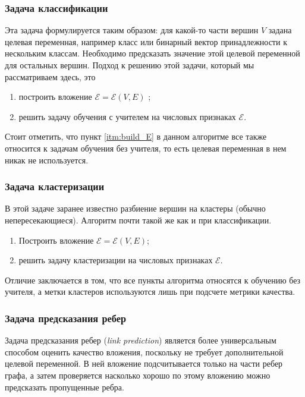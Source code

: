 \documentclass[12pt,a4paper]{extarticle}
\newcommand{\E}{\mathcal{E}}
\begin{document}
    \subsubsection{Задача классификации}
    
    Эта задача формулируется таким образом: для какой-то части вершин $V$ задана целевая переменная, например класс или бинарный вектор принадлежности к нескольким классам. Необходимо предсказать значение этой целевой переменной для остальных вершин.
    Подход к решению этой задачи, который мы рассматриваем здесь, это 
    \begin{enumerate}
        \item построить вложение $\E = \E(V, E)$ \label{itm:build_E};
        \item решить задачу обучения с учителем на числовых признаках $\E$.
    \end{enumerate}
    
    Стоит отметить, что пункт \ref{itm:build_E} в данном алгоритме все также относится к задачам обучения без учителя, то есть целевая переменная в нем никак не используется.
    
    \subsubsection{Задача кластеризации}
    
    В этой задаче заранее известно разбиение вершин на кластеры (обычно непересекающиеся). Алгоритм почти такой же как и при классификации.
    
    \begin{enumerate}
        \item Построить вложение $\E = \E(V, E)$;
        \item решить задачу кластеризации на числовых признаках $\E$.
    \end{enumerate}
    
    Отличие заключается в том, что все пункты алгоритма относятся к обучению без учителя, а метки кластеров используются лишь при подсчете метрики качества.
    
    \subsubsection{Задача предсказания ребер}
    
    Задача предсказания ребер (\textit{link prediction}) является более универсальным способом оценить качество вложения, поскольку не требует дополнительной целевой переменной. В ней вложение подсчитывается только на части ребер графа, а затем проверяется насколько хорошо по этому вложению можно предсказать пропущенные ребра.
    
\end{document}

